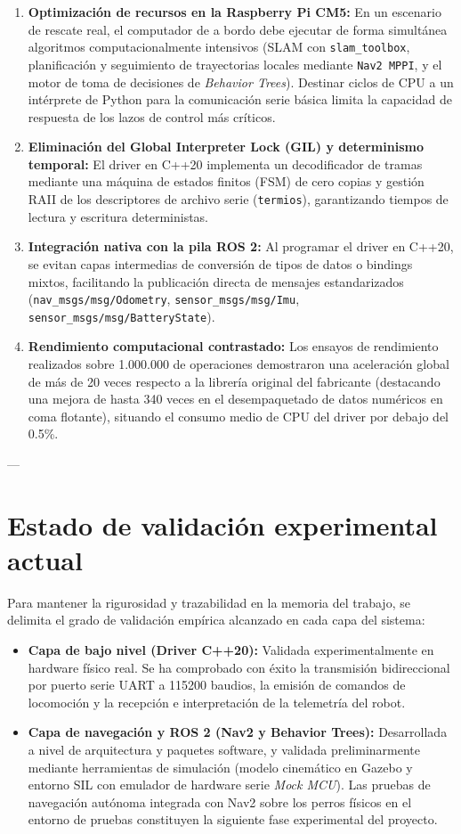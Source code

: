 \begin{enumerate}
    \item \textbf{Optimización de recursos en la Raspberry Pi CM5:} En un escenario de rescate real, el computador de a bordo debe ejecutar de forma simultánea algoritmos computacionalmente intensivos (SLAM con \texttt{slam\_toolbox}, planificación y seguimiento de trayectorias locales mediante \texttt{Nav2 MPPI}, y el motor de toma de decisiones de \textit{Behavior Trees}). Destinar ciclos de CPU a un intérprete de Python para la comunicación serie básica limita la capacidad de respuesta de los lazos de control más críticos.
    \item \textbf{Eliminación del Global Interpreter Lock (GIL) y determinismo temporal:} El driver en C++20 implementa un decodificador de tramas mediante una máquina de estados finitos (FSM) de cero copias y gestión RAII de los descriptores de archivo serie (\texttt{termios}), garantizando tiempos de lectura y escritura deterministas.
    \item \textbf{Integración nativa con la pila ROS 2:} Al programar el driver en C++20, se evitan capas intermedias de conversión de tipos de datos o bindings mixtos, facilitando la publicación directa de mensajes estandarizados (\texttt{nav\_msgs/msg/Odometry}, \texttt{sensor\_msgs/msg/Imu}, \texttt{sensor\_msgs/msg/BatteryState}).
    \item \textbf{Rendimiento computacional contrastado:} Los ensayos de rendimiento realizados sobre 1.000.000 de operaciones demostraron una aceleración global de más de 20 veces respecto a la librería original del fabricante (destacando una mejora de hasta 340 veces en el desempaquetado de datos numéricos en coma flotante), situando el consumo medio de CPU del driver por debajo del 0.5\%.
\end{enumerate}

---

\section{Estado de validación experimental actual}
\label{sec:estado_validacion}

Para mantener la rigurosidad y trazabilidad en la memoria del trabajo, se delimita el grado de validación empírica alcanzado en cada capa del sistema:

\begin{itemize}
    \item \textbf{Capa de bajo nivel (Driver C++20):} Validada experimentalmente en hardware físico real. Se ha comprobado con éxito la transmisión bidireccional por puerto serie UART a 115200 baudios, la emisión de comandos de locomoción y la recepción e interpretación de la telemetría del robot.
    \item \textbf{Capa de navegación y ROS 2 (Nav2 y Behavior Trees):} Desarrollada a nivel de arquitectura y paquetes software, y validada preliminarmente mediante herramientas de simulación (modelo cinemático en Gazebo y entorno SIL con emulador de hardware serie \textit{Mock MCU}). Las pruebas de navegación autónoma integrada con Nav2 sobre los perros físicos en el entorno de pruebas constituyen la siguiente fase experimental del proyecto.
\end{itemize}
